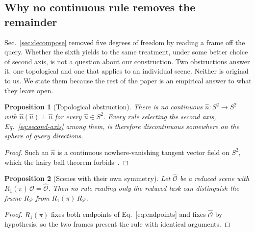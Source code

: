 \documentclass[10pt,twocolumn,letterpaper]{article}
\newtheorem{proposition}{Proposition}
\begin{document}
\subsection{Why no continuous rule removes the remainder}
\label{sec:obstruction}
Sec.~\ref{sec:decompose} removed five degrees of freedom by reading a frame off
the query. Whether the sixth yields to the same treatment, under some better
choice of second axis, is not a question about our construction. Two obstructions
answer it, one topological and one that applies to an individual scene. Neither
is original to us. We state them because the rest of the paper is an empirical
answer to what they leave open.

\begin{proposition}[Topological obstruction]
\label{prop:two}
There is no continuous $\hat{n} : S^2 \to S^2$ with $\hat{n}(\hat{u}) \perp
\hat{u}$ for every $\hat{u} \in S^2$. Every rule selecting the second axis,
Eq.~\eqref{eq:second-axis} among them, is therefore discontinuous somewhere on
the sphere of query directions.
\end{proposition}
\begin{proof}
Such an $\hat{n}$ is a continuous nowhere-vanishing tangent vector field on
$S^2$, which the hairy ball theorem forbids~\cite{milnor1978hairy}.
\end{proof}

\begin{proposition}[Scenes with their own symmetry]
\label{prop:three}
Let $\hat{\mathcal{O}}$ be a reduced scene with
$R_1(\pi)\,\hat{\mathcal{O}} = \hat{\mathcal{O}}$. Then no rule reading only the
reduced task can distinguish the frame $R_{\mathcal{P}}$ from
$R_1(\pi)\,R_{\mathcal{P}}$.
\end{proposition}
\begin{proof}
$R_1(\pi)$ fixes both endpoints of Eq.~\eqref{eq:endpoints} and fixes
$\hat{\mathcal{O}}$ by hypothesis, so the two frames present the rule with
identical arguments.
\end{proof}
\end{document}
